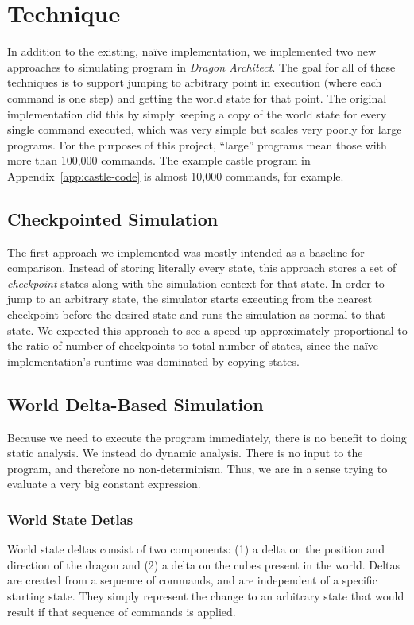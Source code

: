 \documentclass{sig-alternate}
\newcommand{\da}{\emph{Dragon Architect}}
\begin{document}
\section{Technique} 

In addition to the existing, na\"{i}ve implementation, we implemented two new approaches to simulating program in \da. The goal for all of these techniques is to support jumping to arbitrary point in execution (where each command is one step) and getting the world state for that point. The original implementation did this by simply keeping a copy of the world state for every single command executed, which was very simple but scales very poorly for large programs. For the purposes of this project, ``large'' programs mean those with more than 100,000 commands. The example castle program in Appendix~\ref{app:castle-code} is almost 10,000 commands, for example.

\subsection{Checkpointed Simulation}
The first approach we implemented was mostly intended as a baseline for comparison. Instead of storing literally every state, this approach stores a set of \emph{checkpoint} states along with the simulation context for that state. In order to jump to an arbitrary state, the simulator starts executing from the nearest checkpoint before the desired state and runs the simulation as normal to that state. We expected this approach to see a speed-up approximately proportional to the ratio of number of checkpoints to total number of states, since the na\"{i}ve implementation's runtime was dominated by copying states.

\subsection{World Delta-Based Simulation}
Because we need to execute the program immediately, there is no benefit to doing static analysis. We instead do dynamic analysis. There is no input to the program, and therefore no non-determinism. Thus, we are in a sense trying to evaluate a very big constant expression.

\subsubsection{World State Detlas}

World state deltas consist of two components: (1) a delta on the position and direction of the dragon and (2) a delta on the cubes present in the world. Deltas are created from a sequence of commands, and are independent of a specific starting state. They simply represent the change to an arbitrary state that would result if that sequence of commands is applied. 
\end{document}
